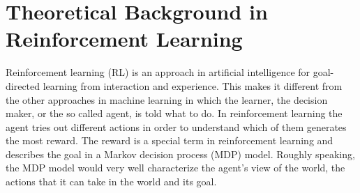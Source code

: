 \section{Theoretical Background in Reinforcement Learning}
Reinforcement learning (RL) is an approach in artificial intelligence for goal-directed learning from interaction and experience. This makes it different from the other approaches in machine learning in which the learner, the decision maker, or the so called agent, is told what to do. In reinforcement learning the agent tries out different actions in order to understand which of them generates the most reward. The reward is a special term in reinforcement learning and describes the goal in a Markov decision process (MDP) model. Roughly speaking, the MDP model would very well characterize the agent’s view of the world, the actions that it can take in the world and its goal.

